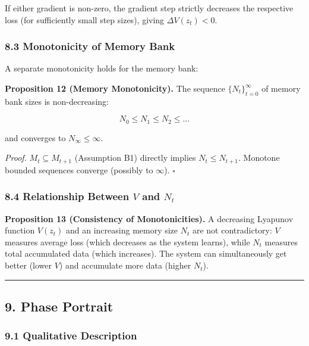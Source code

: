 \documentclass[
  12pt,
]{ctexart}
\begin{document}
If either gradient is non-zero, the gradient step strictly decreases the
respective loss (for sufficiently small step sizes), giving
\(\Delta V(z_t) < 0\).

\subsubsection{8.3 Monotonicity of Memory
Bank}\label{monotonicity-of-memory-bank}

A separate monotonicity holds for the memory bank:

\textbf{Proposition 12 (Memory Monotonicity).} The sequence
\(\{N_t\}_{t=0}^\infty\) of memory bank sizes is non-decreasing:

\[N_0 \leq N_1 \leq N_2 \leq \dots\]

and converges to \(N_\infty \leq \infty\).

\emph{Proof.} \(M_t \subseteq M_{t+1}\) (Assumption B1) directly implies
\(N_t \leq N_{t+1}\). Monotone bounded sequences converge (possibly to
\(\infty\)). \(\square\)

\subsubsection{\texorpdfstring{8.4 Relationship Between \(V\) and
\(N_t\)}{8.4 Relationship Between V and N\_t}}\label{relationship-between-v-and-n_t}

\textbf{Proposition 13 (Consistency of Monotonicities).} A decreasing
Lyapunov function \(V(z_t)\) and an increasing memory size \(N_t\) are
not contradictory: \(V\) measures average loss (which decreases as the
system learns), while \(N_t\) measures total accumulated data (which
increases). The system can simultaneously get better (lower \(V\)) and
accumulate more data (higher \(N_t\)).

\begin{center}\rule{0.5\linewidth}{0.5pt}\end{center}

\subsection{9. Phase Portrait}\label{phase-portrait}

\subsubsection{9.1 Qualitative
Description}\label{qualitative-description}
\end{document}
